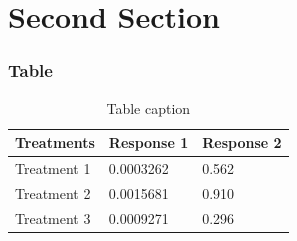 \documentclass[aspectratio=169]{beamer}
\begin{document}
\section{Second Section}

\begin{frame}
\frametitle{Table}
\begin{table}
\begin{tabular}{l l l}
\toprule
\textbf{Treatments} & \textbf{Response 1} & \textbf{Response 2}\\
\midrule
Treatment 1 & 0.0003262 & 0.562 \\
Treatment 2 & 0.0015681 & 0.910 \\
Treatment 3 & 0.0009271 & 0.296 \\
\bottomrule
\end{tabular}
\caption{Table caption}
\end{table}
\end{frame}
\end{document}
